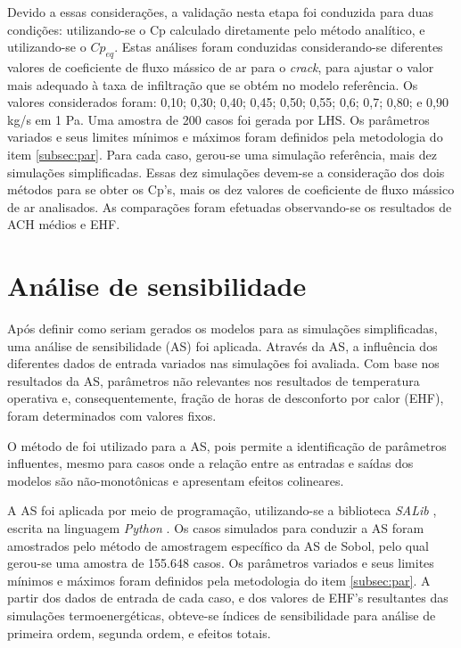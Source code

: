 \documentclass[brazil,hardcopy,openany,a5paper]{ufscthesis}
\begin{document}
		Devido a essas considerações, a validação nesta etapa foi conduzida para duas condições: utilizando-se o Cp calculado diretamente pelo método analítico, e utilizando-se o $Cp_{eq}$.		
		Estas análises foram conduzidas considerando-se diferentes valores de coeficiente de fluxo mássico de ar para o \textit{crack}, para ajustar o valor mais adequado à taxa de infiltração que se obtém no modelo referência. Os valores considerados foram: 0,10; 0,30; 0,40; 0,45; 0,50; 0,55; 0,6; 0,7; 0,80; e 0,90 kg/s em 1 Pa.
		Uma amostra de 200 casos foi gerada por LHS.
		Os parâmetros variados e seus limites mínimos e máximos foram definidos pela metodologia do item \ref{subsec:par}.
		Para cada caso, gerou-se uma simulação referência, mais dez simulações simplificadas. Essas dez simulações devem-se a consideração dos dois métodos para se obter os Cp's, mais os dez valores de coeficiente de fluxo mássico de ar analisados. As comparações foram efetuadas observando-se os resultados de ACH médios e EHF. 
		
		\section{Análise de sensibilidade}
		
		Após definir como seriam gerados os modelos para as simulações simplificadas, uma análise de sensibilidade (AS) foi aplicada. Através da AS, a influência dos diferentes dados de entrada variados nas simulações foi avaliada. Com base nos resultados da AS, parâmetros não relevantes nos resultados de temperatura operativa e, consequentemente, fração de horas de desconforto por calor (EHF), foram determinados com valores fixos.
		
		O método de  \cite{Sobol1993} foi utilizado para a AS, pois permite a identificação de parâmetros influentes, mesmo para casos onde a relação entre as entradas e saídas dos modelos são não-monotônicas e apresentam efeitos colineares.
		
		A AS foi aplicada por meio de programação, utilizando-se a biblioteca \textit{SALib} \cite{Herman2017}, escrita na linguagem \textit{Python} \cite{Python}.
		Os casos simulados para conduzir a AS foram amostrados pelo método de amostragem específico da AS de Sobol, pelo qual gerou-se uma amostra de 155.648 casos.
		Os parâmetros variados e seus limites mínimos e máximos foram definidos pela metodologia do item \ref{subsec:par}. 
		A partir dos dados de entrada de cada caso, e dos valores de EHF's resultantes das simulações termoenergéticas, obteve-se índices de sensibilidade para análise de primeira ordem, segunda ordem, e efeitos totais.
		
\end{document}
